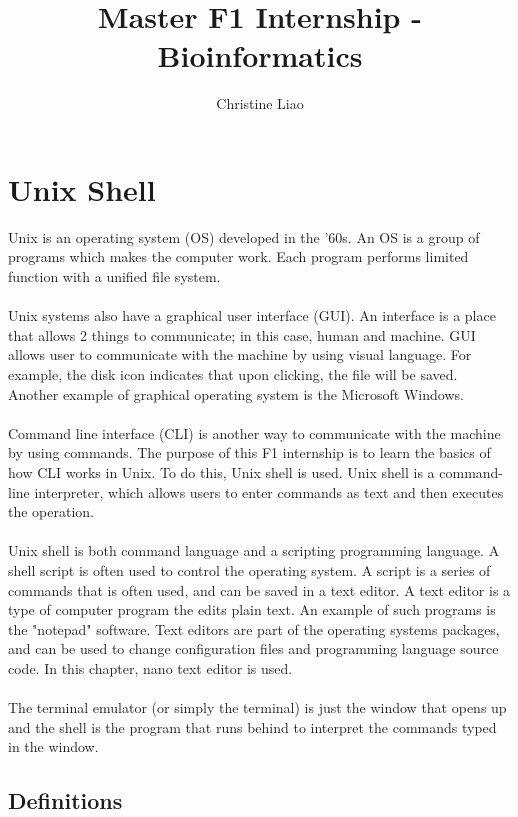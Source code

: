 \documentclass{article}
\title{\huge\textbf{Master F1 Internship - Bioinformatics}}
\author{\LARGE Christine Liao}
\date{\parbox{\linewidth}{\centering%
  \today \endgraf
  \bigskip
  \vspace{10cm}
  \LARGE Supervisor:\ Dr. Konrad F\"orstner \endgraf
  Core Unit Systems Medicine\endgraf
  Julius Maximilian University - W\"urzburg}}
\begin{document}
\maketitle
\newpage
  \tableofcontents
\newpage  
{}



\section{Unix Shell}

Unix is an operating system (OS) developed in the '60s. An OS is a group of programs which makes the computer work. Each program performs limited function with a unified file system.\\
\\
Unix systems also have a graphical user interface (GUI). An interface is a place that allows 2 things to communicate; in this case, human and machine. GUI allows user to communicate with the machine by using visual language. For example, the disk icon indicates that upon clicking, the file will be saved. Another example of graphical operating system is the Microsoft Windows.\\
\\
Command line interface (CLI) is another way to communicate with the machine by using commands. The purpose of this F1 internship is to learn the basics of how CLI works in Unix. To do this, Unix shell is used. Unix shell is a command-line interpreter, which allows users to enter commands as text and then executes the operation.\\
\\
Unix shell is both command language and a scripting programming language. A shell script is often used to control the operating system. A script is a series of commands that is often used, and can be saved in a text editor. A text editor is a type of computer program the edits plain text. An example of such programs is the "notepad" software. Text editors are part of the operating systems packages, and can be used to change configuration files and programming language source code. In this chapter, nano text editor is used. \\
\\
The terminal emulator (or simply the terminal) is just the window that opens up and the shell is the program that runs behind to interpret the commands typed in the window. 

\subsection{\textbf{Definitions}}
\end{document}
